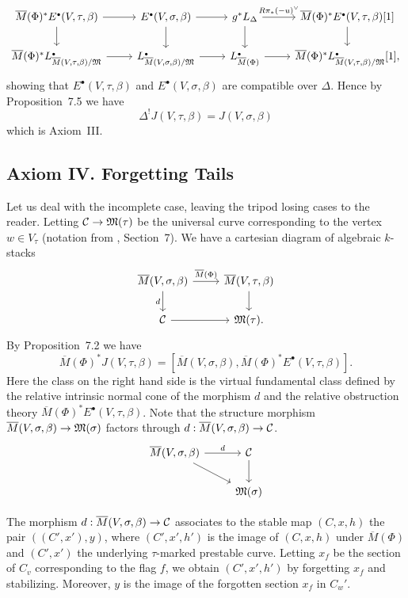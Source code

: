 \documentclass{article}
\newcommand{\dual}[1]{{{#1}^{\vee}}}
\newcommand{\upst}{^{\ast}}
\newcommand{\upsh}{^{!}}
\newcommand{\lst}{_{\ast}}
\newcommand{\com}{^{\scriptscriptstyle\bullet}}
\newcommand{\MM}{{\frak M}}
\newcommand{\cC}{{\cal C}}
\newcommand{\ol}{\overline}
\newcommand{\ldiag}[1]%
       {\makebox[0cm]{${\scriptstyle#1}\downarrow\phantom{\scriptstyle#1}$}}
\newcommand{\rdiag}[1]%
       {\makebox[0cm]{$\phantom{\scriptstyle#1}\downarrow{\scriptstyle#1}$}}
\newcommand{\sediag}[1]%
       {\makebox[0cm]{${\scriptstyle#1}\searrow\phantom{\scriptstyle#1}$}}
\newcommand{\comdia}[9]{%
\begin{array}{ccc}
#1 & \stackrel{#2}{\longrightarrow} & #3 \\
\ldiag{#4} & #5 & \rdiag{#6} \\
#7 & \stackrel{#8}{\longrightarrow} & #9
\end{array}}
\newcommand{\comtri}[6]{%
\begin{array}{ccc}
#1 & \stackrel{#2}{\longrightarrow} & #3         \\
   & \sediag{#4}                    & \rdiag{#5} \\
   &                                & #6
\end{array}}
\begin{document}
\[
\begin{tikzcd}
\ol{M}(\Phi)\upst E\com(V,\tau,\beta) \rar \dar &
E\com(V,\sigma,\beta) \rar \dar &
g\upst L_{\Delta} \rar["\dual{R\pi\lst(-u)}"] \dar &
\ol{M}(\Phi)\upst E\com(V,\tau,\beta)[1] \dar \\
\ol{M}(\Phi)\upst L\com_{\ol{M}(V,\tau,\beta)/\MM} \rar &
L\com_{\ol{M}(V,\sigma,\beta)/\MM} \rar &
L\com_{\ol{M}(\Phi)} \rar &
\ol{M}(\Phi)\upst L\com_{\ol{M}(V,\tau,\beta)/\MM}[1],
\end{tikzcd}
\]
showing that $E\com(V,\tau,\beta)$ and $E\com(V,\sigma,\beta)$ are
compatible over $\Delta$.
Hence by \cite{BF} Proposition~7.5 we have
\[\Delta\upsh J(V,\tau,\beta)=J(V,\sigma,\beta)\]
which is Axiom~III.

\subsection{{\sc Axiom IV.} Forgetting Tails}

Let us deal with the incomplete case, leaving the tripod losing cases
to the reader.
Letting $\cC\to\MM(\tau)$ be the universal curve corresponding to the
vertex $w\in V_{\tau}$ (notation from \cite{BM}, Section~7). We have a
cartesian diagram of algebraic $k$-stacks
\[
\begin{tikzcd}
  \ol{M}(V,\sigma,\beta) \rar["\ol{M}(\Phi)"] \dar["d"'] &
  \ol{M}(V,\tau,\beta) \dar \\
  \cC \rar &
  \MM(\tau).
\end{tikzcd}\]
By \cite{BF} Proposition~7.2 we have
\[\ol{M}(\Phi)\upst
J(V,\tau,\beta) = [\ol{M}(V,\sigma,\beta),\ol{M}(\Phi)\upst
E\com(V,\tau,\beta)].\]
Here the class on the right hand side is the virtual fundamental class
defined by the relative intrinsic normal cone of the morphism $d$ and
the relative obstruction theory $\ol{M}(\Phi)\upst
E\com(V,\tau,\beta)$.
Note that the structure morphism
$\ol{M}(V,\sigma,\beta)\to\MM(\sigma)$ factors through
$d:\ol{M}(V,\sigma,\beta)\to\cC$.
\[\begin{tikzcd}
  \ol{M}(V,\sigma,\beta) \rar["d"] \drar & \cC \dar \\
  & \MM(\sigma)
\end{tikzcd}\]

The morphism $d:\ol{M}(V,\sigma,\beta)\to\cC$ associates to the stable
map $(C,x,h)$ the pair $((C',x'),y)$, where $(C',x',h')$ is the image
of $(C,x,h)$ under $\ol{M}(\Phi)$ and $(C',x')$ the underlying
$\tau$-marked prestable curve. Letting $x_f$ be the section of $C_v$
corresponding to the flag $f$, we obtain $(C',x',h')$ by forgetting
$x_f$ and stabilizing. Moreover, $y$ is the image of the forgotten
section $x_f$ in $C_w'$.
\end{document}
